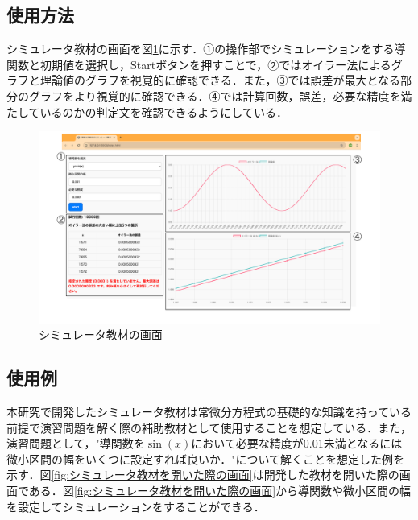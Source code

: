 \documentclass[a4paper, 12pt]{ltjsarticle}
\begin{document}
\subsection{使用方法}
シミュレータ教材の画面を図\ref{fig:シミュレータ教材の画面}に示す．①の操作部でシミュレーションをする導関数と初期値を選択し，Startボタンを押すことで，②ではオイラー法によるグラフと理論値のグラフを視覚的に確認できる．また，③では誤差が最大となる部分のグラフをより視覚的に確認できる．④では計算回数，誤差，必要な精度を満たしているのかの判定文を確認できるようにしている．

\begin{figure}[h]
\begin{center}
\includegraphics[clip,width=\textwidth,keepaspectratio]{sim-image.pdf}
\end{center}
\caption{シミュレータ教材の画面}
\label{fig:シミュレータ教材の画面}
\end{figure}

\clearpage
\subsection{使用例}
本研究で開発したシミュレータ教材は常微分方程式の基礎的な知識を持っている前提で演習問題を解く際の補助教材として使用することを想定している．また，演習問題として，"導関数を$\sin(x)$において必要な精度が0.01未満となるには微小区間の幅をいくつに設定すれば良いか．"について解くことを想定した例を示す．図\ref{fig:シミュレータ教材を開いた際の画面}は開発した教材を開いた際の画面である．図\ref{fig:シミュレータ教材を開いた際の画面}から導関数や微小区間の幅を設定してシミュレーションをすることができる．
\end{document}
